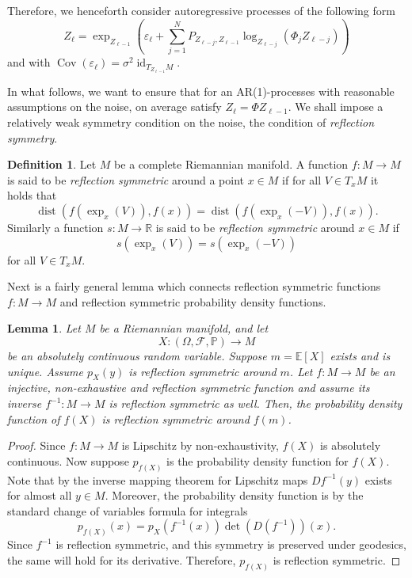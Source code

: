 \documentclass[12pt,a4paper]{article}
\newtheorem{lemma}[theorem]{Lemma}
\theoremstyle{definition}
\newtheorem{definition}[theorem]{Definition}
\theoremstyle{remark}
\DeclareMathOperator{\Cov}{Cov}
\DeclareMathOperator{\dist}{dist}
\DeclareMathOperator{\id}{id}
\begin{document}
Therefore, we henceforth consider autoregressive processes of the following form
\begin{equation}
Z_\ell = \exp_{Z_{\ell-1}}\left(\varepsilon_\ell + \sum_{j=1}^N P_{Z_{\ell-j},Z_{\ell-1}}\log_{Z_{\ell-j}}(\Phi_j Z_{\ell-j}) \right)
\label{eq:autoregressivehomo}
\end{equation}
and with $\Cov(\varepsilon_\ell)=\sigma^2 \id_{T_{Z_{\ell-1}}M}$.

In what follows, we want to ensure that for an AR(1)-processes with reasonable assumptions on the noise, on average satisfy $Z_\ell=\Phi Z_{\ell-1}$. We shall impose a relatively weak symmetry condition on the noise, the condition of \textit{reflection symmetry}.

\begin{definition}
Let $M$ be a complete Riemannian manifold. A function $f:M\rightarrow M$ is said to be \textit{reflection symmetric} around a point $x\in  M$ if for all $V\in T_x M$ it holds that
\begin{equation}
\dist(f(\exp_{x}(V)),f(x) )=\dist(f(\exp_{x}(-V)),f(x)).
\label{eq:liegroupactionAR}
\end{equation}
Similarly a function $s:M \rightarrow \mathbb{R}$ is said to be \textit{reflection symmetric} around $x\in M$ if
\[
s(\exp_x(V))=s(\exp_x(-V))
\]
for all $V\in T_x M$.
\end{definition}

Next is a fairly general lemma which connects reflection symmetric functions $f:M\rightarrow M$ and reflection symmetric probability density functions.

\begin{lemma}
\label{lem:lipreflect}
Let $M$ be a Riemannian manifold, and let
\[
X:(\Omega,\mathcal{F},\mathbb{P}) \rightarrow M
\]
be an absolutely continuous random variable. Suppose $m=\mathbb{E}[X]$ exists and is unique. Assume $p_X(y)$ is reflection symmetric around $m$. Let $f:M\rightarrow M$ be an injective, non-exhaustive and reflection symmetric function and assume its inverse $f^{-1}:M\rightarrow M$ is reflection symmetric as well.
Then, the probability density function of $f(X)$ is reflection symmetric around $f(m)$.
\end{lemma}

\begin{proof}
Since $f:M\rightarrow M$ is Lipschitz by non-exhaustivity, $f(X)$ is absolutely continuous. Now suppose $p_{f(X)}$ is the probability density function for $f(X)$. Note that by the inverse mapping theorem for Lipschitz maps $D f^{-1}(y)$ exists for almost all $y\in M$. Moreover, the probability density function is by the standard change of variables formula for integrals
\[
p_{f(X)}(x) = p_{X}(f^{-1}(x))\det (D(f^{-1}))(x).
\]
Since $f^{-1}$ is reflection symmetric, and this symmetry is preserved under geodesics, the same will hold for its derivative. Therefore, $p_{f(X)}$ is reflection symmetric.
\end{proof}
\end{document}
